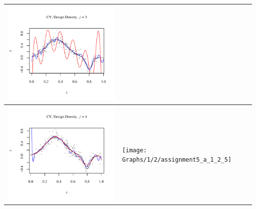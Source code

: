 \documentclass[11pt]{article}
\begin{document}
\begin{table}[h!]
\begin{center}
\begin{tabular}{| >{\centering\arraybackslash}m{2.1in} |  >{\centering\arraybackslash}m{2.1in} |  >{\centering\arraybackslash}m{2.1in}|}
      \includegraphics[width=1\linewidth,height=0.18\textheight]{Graphs/1/2/assignment5_a_1_2_3}\\\hline
      \includegraphics[width=1\linewidth,height=0.18\textheight]{Graphs/1/2/assignment5_a_1_2_4}&
      \texttt{[image: Graphs/1/2/assignment5\_a\_1\_2\_5]}&

\end{tabular}
\end{center}
\end{table}
\end{document}
